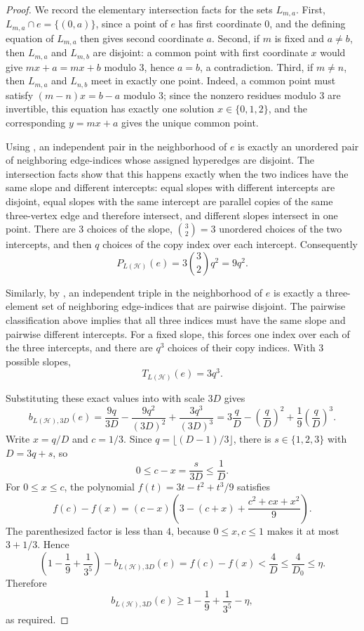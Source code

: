 \begin{proof}
We record the elementary intersection facts for the sets $L_{m,a}$.  First,
$L_{m,a}\cap e=\{(0,a)\}$, since a point of $e$ has first coordinate $0$, and
the defining equation of $L_{m,a}$ then gives second coordinate $a$.  Second,
if $m$ is fixed and $a\ne b$, then $L_{m,a}$ and $L_{m,b}$ are disjoint:
a common point with first coordinate $x$ would give
$mx+a=mx+b$ modulo $3$, hence $a=b$, a contradiction.  Third, if
$m\ne n$, then $L_{m,a}$ and $L_{n,b}$ meet in exactly one point.  Indeed,
a common point must satisfy $(m-n)x=b-a$ modulo $3$; since the nonzero
residues modulo $3$ are invertible, this equation has exactly one solution
$x\in\{0,1,2\}$, and the corresponding $y=mx+a$ gives the unique common
point.

Using , an independent pair in the
neighborhood of $e$ is exactly an unordered pair of neighboring edge-indices
whose assigned hyperedges are disjoint.  The intersection facts show that this
happens exactly when the two indices have the same slope and different
intercepts: equal slopes with different intercepts are disjoint, equal slopes
with the same intercept are parallel copies of the same three-vertex edge and
therefore intersect, and different slopes intersect in one point.  There are
$3$ choices of the slope, $\binom32=3$ unordered choices of the two
intercepts, and then $q$ choices of the copy index over each intercept.
Consequently
\[
P_{L(\mathcal H)}(e)=3\binom32 q^2=9q^2.
\]

Similarly, by , an independent triple in the
neighborhood of $e$ is exactly a three-element set of neighboring edge-indices
that are pairwise disjoint.  The pairwise classification above implies that
all three indices must have the same slope and pairwise different intercepts.
For a fixed slope, this forces one index over each of the three intercepts,
and there are $q^3$ choices of their copy indices.  With $3$ possible slopes,
\[
T_{L(\mathcal H)}(e)=3q^3.
\]

Substituting these exact values into  with scale
$3D$ gives
\[
b_{L(\mathcal H),3D}(e)
=\frac{9q}{3D}-\frac{9q^2}{(3D)^2}+\frac{3q^3}{(3D)^3}
=3\frac qD-\left(\frac qD\right)^2+\frac19\left(\frac qD\right)^3.
\]
Write $x=q/D$ and $c=1/3$.  Since $q=\lfloor(D-1)/3\rfloor$, there is
$s\in\{1,2,3\}$ with $D=3q+s$, so
\[
0\le c-x=\frac{s}{3D}\le \frac1D .
\]
For $0\le x\le c$, the polynomial $f(t)=3t-t^2+t^3/9$ satisfies
\[
f(c)-f(x)=(c-x)\left(3-(c+x)+\frac{c^2+cx+x^2}{9}\right).
\]
The parenthesized factor is less than $4$, because $0\le x,c\le 1$ makes it
at most $3+1/3$.  Hence
\[
\left(1-\frac19+\frac1{3^5}\right)
-b_{L(\mathcal H),3D}(e)
=f(c)-f(x)
< \frac4D
\le \frac4{D_0}
\le \eta .
\]
Therefore
\[
b_{L(\mathcal H),3D}(e)\ge
1-\frac19+\frac1{3^5}-\eta,
\]
as required.
\end{proof}
